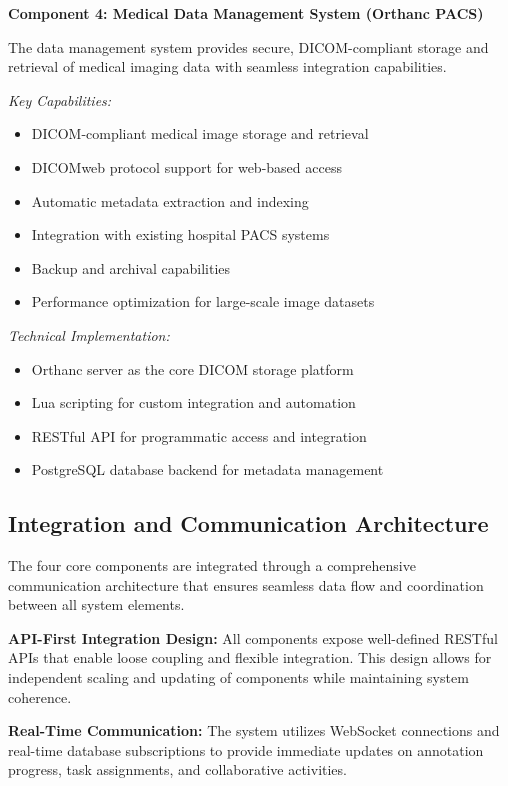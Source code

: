 \textbf{Component 4: Medical Data Management System (Orthanc PACS)}

The data management system provides secure, DICOM-compliant storage and retrieval of medical imaging data with seamless integration capabilities.

\textit{Key Capabilities:}
\begin{itemize}
    \item DICOM-compliant medical image storage and retrieval
    \item DICOMweb protocol support for web-based access
    \item Automatic metadata extraction and indexing
    \item Integration with existing hospital PACS systems
    \item Backup and archival capabilities
    \item Performance optimization for large-scale image datasets
\end{itemize}

\textit{Technical Implementation:}
\begin{itemize}
    \item Orthanc server as the core DICOM storage platform
    \item Lua scripting for custom integration and automation
    \item RESTful API for programmatic access and integration
    \item PostgreSQL database backend for metadata management
\end{itemize}

\subsection{Integration and Communication Architecture}

The four core components are integrated through a comprehensive communication architecture that ensures seamless data flow and coordination between all system elements.

\textbf{API-First Integration Design:} All components expose well-defined RESTful APIs that enable loose coupling and flexible integration. This design allows for independent scaling and updating of components while maintaining system coherence.

\textbf{Real-Time Communication:} The system utilizes WebSocket connections and real-time database subscriptions to provide immediate updates on annotation progress, task assignments, and collaborative activities.

